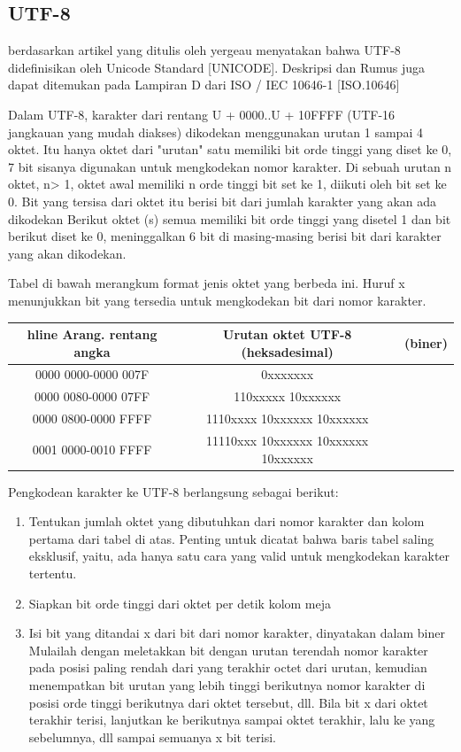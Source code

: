 \begin{itemize}
	\section{UTF-8}
	 berdasarkan artikel yang ditulis oleh yergeau menyatakan bahwa \cite{yergeau1996utf}
		UTF-8 didefinisikan oleh Unicode Standard [UNICODE]. Deskripsi dan
   Rumus juga dapat ditemukan pada Lampiran D dari ISO / IEC 10646-1 [ISO.10646]

   Dalam UTF-8, karakter dari rentang U + 0000..U + 10FFFF (UTF-16
   jangkauan yang mudah diakses) dikodekan menggunakan urutan 1 sampai 4 oktet. Itu
   hanya oktet dari "urutan" satu memiliki bit orde tinggi yang diset ke 0,
   7 bit sisanya digunakan untuk mengkodekan nomor karakter. Di sebuah
   urutan n oktet, n> 1, oktet awal memiliki n orde tinggi
   bit set ke 1, diikuti oleh bit set ke 0. Bit yang tersisa dari
   oktet itu berisi bit dari jumlah karakter yang akan ada
   dikodekan Berikut oktet (s) semua memiliki bit orde tinggi yang disetel
   1 dan bit berikut diset ke 0, meninggalkan 6 bit di masing-masing berisi
   bit dari karakter yang akan dikodekan.

   Tabel di bawah merangkum format jenis oktet yang berbeda ini.
   Huruf x menunjukkan bit yang tersedia untuk mengkodekan bit dari
   nomor karakter.
 \begin{tabular}{|c|c|c}
 hline
 Arang. rentang angka & Urutan oktet UTF-8
 (heksadesimal) & (biner)\\
 \hline
 0000 0000-0000 007F & 0xxxxxxx\\
 0000 0080-0000 07FF & 110xxxxx 10xxxxxx\\
 0000 0800-0000 FFFF & 1110xxxx 10xxxxxx 10xxxxxx\\
 0001 0000-0010 FFFF & 11110xxx 10xxxxxx 10xxxxxx 10xxxxxx\\
\hline
\end{tabular}


   Pengkodean karakter ke UTF-8 berlangsung sebagai berikut:
   \begin{enumerate}
   	\item Tentukan jumlah oktet yang dibutuhkan dari nomor karakter
       dan kolom pertama dari tabel di atas. Penting untuk dicatat
       bahwa baris tabel saling eksklusif, yaitu, ada
       hanya satu cara yang valid untuk mengkodekan karakter tertentu.
    \item Siapkan bit orde tinggi dari oktet per detik
       kolom meja
    \item Isi bit yang ditandai x dari bit dari nomor karakter,
       dinyatakan dalam biner Mulailah dengan meletakkan bit dengan urutan terendah
       nomor karakter pada posisi paling rendah dari yang terakhir
       octet dari urutan, kemudian menempatkan bit urutan yang lebih tinggi berikutnya
       nomor karakter di posisi orde tinggi berikutnya dari oktet tersebut,
       dll. Bila bit x dari oktet terakhir terisi, lanjutkan ke
       berikutnya sampai oktet terakhir, lalu ke yang sebelumnya, dll sampai semuanya
       x bit terisi.
    \end{enumerate}


\end{itemize}
